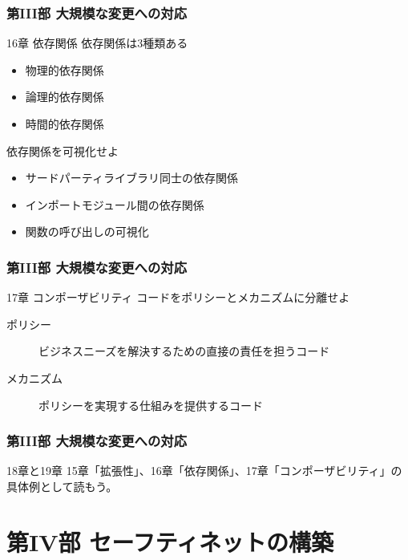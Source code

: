 \documentclass[aspectratio=169,dvipdfmx,14pt,notheorems]{beamer}
\theoremstyle{definition}
\begin{document}
\begin{frame}\frametitle{第III部 大規模な変更への対応}

\begin{block}{16章 依存関係}
依存関係は3種類ある
\begin{itemize}
\item 物理的依存関係
\item 論理的依存関係
\item 時間的依存関係
\end{itemize}
\end{block}

\begin{exampleblock}{依存関係を可視化せよ}
\begin{itemize}
\item サードパーティライブラリ同士の依存関係
\item インポートモジュール間の依存関係
\item 関数の呼び出しの可視化
\end{itemize}
\end{exampleblock}

\end{frame}

\begin{frame}\frametitle{第III部 大規模な変更への対応}

\begin{block}{17章 コンポーザビリティ}
コードをポリシーとメカニズムに分離せよ
\begin{description}
\item[ポリシー] ビジネスニーズを解決するための直接の責任を担うコード
\item[メカニズム] ポリシーを実現する仕組みを提供するコード
\end{description}
\end{block}

\end{frame}

\begin{frame}\frametitle{第III部 大規模な変更への対応}

\begin{block}{18章と19章}
15章「拡張性」、16章「依存関係」、17章「コンポーザビリティ」の具体例として読もう。
\end{block}

\end{frame}

\section{第IV部 セーフティネットの構築}
\end{document}
